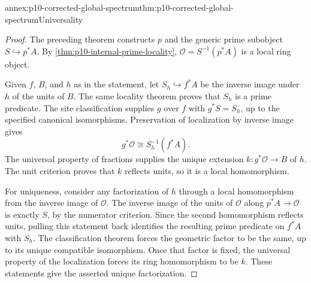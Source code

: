 \begin{annexitem}{annex:p10-corrected-global-spectrum}{thm:p10-corrected-global-spectrum}{Universality}
\begin{proof}
The preceding theorem constructs \(p\) and the generic prime
subobject \(S\hookrightarrow p^*A\).
By \cref{thm:p10-internal-prime-locality},
\(\mathcal O=S^{-1}(p^*A)\) is a local ring object.

Given \(f\), \(B\), and \(h\) as in the statement, let
\(S_h\hookrightarrow f^*A\) be the inverse image under \(h\)
of the units of \(B\).
The same locality theorem proves that \(S_h\) is a prime
predicate. The site classification supplies \(g\) over \(f\)
with \(g^*S=S_h\), up to the specified canonical isomorphisms.
Preservation of localization by inverse image gives
\[
 g^*\mathcal O\cong S_h^{-1}(f^*A).
\]
The universal property of fractions supplies the unique
extension \(k:g^*\mathcal O\to B\) of \(h\).
The unit criterion proves that \(k\) reflects units, so it
is a local homomorphism.

For uniqueness, consider any factorization of \(h\) through
a local homomorphism from the inverse image of \(\mathcal O\).
The inverse image of the units of \(\mathcal O\) along
\(p^*A\to\mathcal O\) is exactly \(S\), by the numerator
criterion. Since the second homomorphism reflects units,
pulling this statement back identifies the resulting prime
predicate on \(f^*A\) with \(S_h\).
The classification theorem forces the geometric factor to
be the same, up to its unique compatible isomorphism.
Once that factor is fixed, the universal property of the
localization forces its ring homomorphism to be \(k\).
These statements give the asserted unique factorization.
\end{proof}
\end{annexitem}
